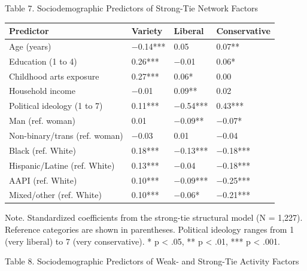 \documentclass[
  12pt
]{article}
\begin{document}
Table 7. Sociodemographic Predictors of Strong-Tie Network Factors

\begin{tabular*}{\textwidth}{@{\extracolsep{\fill}}>{\raggedright\arraybackslash}p{} @{\hspace{1pt}}>{\raggedleft\arraybackslash}p{}@{\hspace{1pt}}>{\raggedleft\arraybackslash}p{}@{\hspace{1pt}}>{\raggedleft\arraybackslash}p{}@{}}
\toprule
Predictor & Variety & Liberal & Conservative \\
\midrule
Age (years) & $-$0.14*** & \hphantom{$-$}0.05 & \hphantom{$-$}0.07** \\
Education (1 to 4) & \hphantom{$-$}0.26*** & $-$0.01 & \hphantom{$-$}0.06* \\
Childhood arts exposure & \hphantom{$-$}0.27*** & \hphantom{$-$}0.06* & \hphantom{$-$}0.00 \\
Household income & $-$0.01 & \hphantom{$-$}0.09** & \hphantom{$-$}0.02 \\
Political ideology (1 to 7) & \hphantom{$-$}0.11*** & $-$0.54*** & \hphantom{$-$}0.43*** \\
Man (ref. woman) & \hphantom{$-$}0.01 & $-$0.09** & $-$0.07* \\
Non-binary/trans (ref. woman) & $-$0.03 & \hphantom{$-$}0.01 & $-$0.04 \\
Black (ref. White) & \hphantom{$-$}0.18*** & $-$0.13*** & $-$0.18*** \\
Hispanic/Latine (ref. White) & \hphantom{$-$}0.13*** & $-$0.04 & $-$0.18*** \\
AAPI (ref. White) & \hphantom{$-$}0.10*** & $-$0.09*** & $-$0.25*** \\
Mixed/other (ref. White) & \hphantom{$-$}0.10*** & $-$0.06* & $-$0.21*** \\
\bottomrule
\end{tabular*}

Note. Standardized coefficients from the strong-tie structural model (N = 1,227). Reference categories are shown in parentheses. Political ideology ranges from 1 (very liberal) to 7 (very conservative). * p < .05, ** p < .01, *** p < .001.

Table 8. Sociodemographic Predictors of Weak- and Strong-Tie Activity Factors
\end{document}
